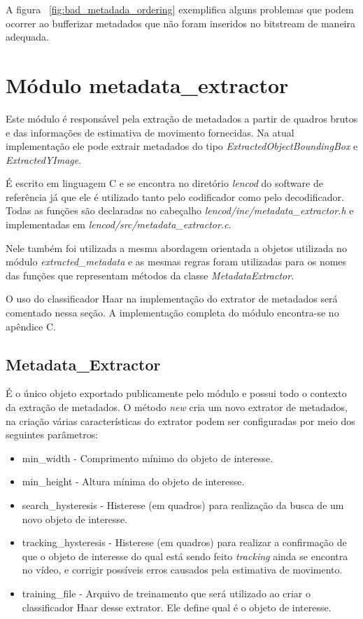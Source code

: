A figura ~\ref{fig:bad_metadada_ordering} exemplifica alguns problemas que podem ocorrer ao bufferizar metadados que não foram inseridos no bitstream de maneira adequada.


\section{ Módulo metadata\_extractor }

Este módulo é responsável pela extração de metadados a partir de quadros brutos e das informações de estimativa de movimento fornecidas. Na atual implementação  ele pode extrair metadados do tipo \textit{ExtractedObjectBoundingBox} e \textit{ExtractedYImage}.

É escrito em linguagem C e se encontra no diretório \textit{lencod} do software de referência já que ele é utilizado tanto pelo codificador como pelo decodificador. Todas as funções são declaradas no cabeçalho \textit{lencod/inc/metadata\_extractor.h} e implementadas em \textit{lencod/src/metadata\_extractor.c}.

Nele também foi utilizada a mesma abordagem orientada a objetos utilizada no módulo \textit{extracted\_metadata} e as mesmas regras foram utilizadas para os nomes das funções que representam métodos da classe \textit{MetadataExtractor}.

O uso do classificador Haar na implementação do extrator de metadados será comentado nessa seção. A implementação completa do módulo encontra-se no apêndice C.


\subsection{ Metadata\_Extractor }

É o único objeto exportado publicamente pelo módulo e possui todo o contexto da extração de metadados. O método \textit{new} cria um novo extrator de metadados, na criação várias características do extrator podem ser configuradas por meio dos seguintes parâmetros: 

\begin{itemize}
	\item min\_width - Comprimento mínimo do objeto de interesse.
	\item min\_height - Altura mínima do objeto de interesse.
	\item search\_hysteresis - Histerese (em quadros) para realização da busca de um novo objeto de interesse.
	\item tracking\_hysteresis - Histerese (em quadros) para realizar a confirmação de que o objeto de interesse do qual está sendo feito \textit{tracking} ainda se encontra no vídeo, e corrigir possíveis erros causados pela estimativa de movimento.
        \item training\_file - Arquivo de treinamento que será utilizado ao criar o classificador Haar desse extrator. Ele define qual é o objeto de interesse.
\end{itemize}

